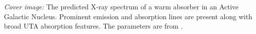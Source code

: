 \documentclass[12pt]{book}
\begin{document}
\clearpage

\vspace{5mm}
\noindent
{\small {\em Cover image:} The predicted X-ray spectrum of a warm absorber in
  an Active Galactic Nucleus. Prominent emission and absorption lines are
  present along with broad UTA absorption features. The parameters are from
  \citet{Reynolds1995}.
}
\clearpage

\tableofcontents
\listoffigures
\listoftables

\clearpage
\mainmatter

\backmatter


\end{document}
